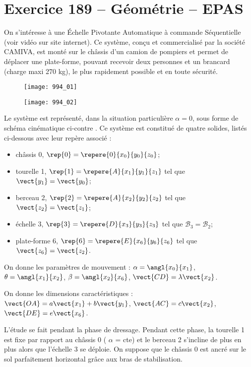 \section*{Exercice 189 -- Géométrie -- EPAS}
\setcounter{exo}{0}


On s’intéresse à une Échelle Pivotante Automatique à commande Séquentielle (voir vidéo sur site internet).
Ce système, conçu et commercialisé par la société CAMIVA, est monté sur le châssis d’un camion de pompiers et permet de
déplacer une plate-forme, pouvant recevoir deux personnes et un brancard (charge maxi 270 kg), le plus rapidement
possible et en toute sécurité.

\begin{figure}[H]
\centering
\texttt{[image: 994\_01]}
\end{figure}

\begin{figure}[H]
\centering
\texttt{[image: 994\_02]}
\end{figure}



Le système est représenté, dans la situation particulière $\alpha= 0$, sous forme de schéma cinématique ci-contre .
Ce système est constitué de quatre solides, listés ci-dessous avec leur repère associé :
\begin{itemize}
\item châssis 0, $\rep{0}=\repere{0}{x_0}{y_0}{z_0}$;
\item tourelle 1, $\rep{1}=\repere{A}{x_1}{y_1}{z_1}$ tel que $\vect{y_1}=\vect{y_0}$;
\item berceau 2, $\rep{2}=\repere{A}{x_2}{y_2}{z_2}$ tel que $\vect{z_2}=\vect{z_1}$;
\item échelle 3, $\rep{3}=\repere{D}{x_3}{y_3}{z_3}$ tel que $\mathcal{B}_3=\mathcal{B}_2$;
\item plate-forme 6, $\rep{6}=\repere{E}{x_6}{y_6}{z_6}$ tel que $\vect{z_6}=\vect{z_2}$.
\end{itemize}

On donne les paramètres de mouvement :
$\alpha = \angl{x_0}{x_1}$, $\theta= \angl{x_1}{x_2}$, $\beta = \angl{x_2}{x_6}$, $\vect{CD}= \lambda \vect{x_2}$.

On donne les dimensions caractéristiques : $\vect{OA}=a\vect{x_1} + b\vect{y_1}$, $\vect{AC} = c\vect{x_2}$, $\vect{DE}=e\vect{x_6}$.

L’étude se fait pendant la phase de dressage. Pendant cette phase, la tourelle 1 est fixe par rapport au châssis 0 ( $\alpha$ = cte) et le berceau 2 s’incline de plus en plus alors que l’échelle 3 se déploie. On suppose que le châssis 0 est ancré sur le sol
parfaitement horizontal grâce aux bras de stabilisation.

